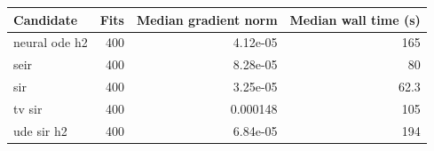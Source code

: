 \begin{tabular}{lrrr}
\toprule
Candidate & Fits & Median gradient norm & Median wall time (s)\\
\midrule
neural ode h2 & 400 & 4.12e-05 & 165\\
seir & 400 & 8.28e-05 & 80\\
sir & 400 & 3.25e-05 & 62.3\\
tv sir & 400 & 0.000148 & 105\\
ude sir h2 & 400 & 6.84e-05 & 194\\
\bottomrule
\end{tabular}
